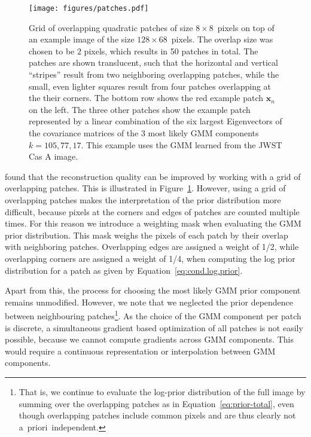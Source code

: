 \documentclass[twocolumn, linenumbers]{aastex631}
\newcommand{\aprioir}{a~priori~}
\begin{document}
 \begin{figure}
        \begin{centering}
            \texttt{[image: figures/patches.pdf]}
            \caption{
                Grid of overlapping quadratic patches of size $8\times8$~pixels on top of an example image of the size $128 \times 68$~pixels. The overlap size was chosen to be $2$ pixels, which results in 50 patches in total. The patches are shown translucent, such that the horizontal and vertical \enquote{stripes} result from two neighboring overlapping patches, while the small, even lighter squares result from four patches overlapping at the their corners. The bottom row shows the red example patch $\mathbf{x}_n$ on the left. The three other patches show the example patch represented by a linear combination of the six largest Eigenvectors of the covariance matrices of the 3 most likely GMM components $k = 105, 77, 17$. This example uses the GMM learned from the JWST Cas A image.
            }
            \label{fig:patches}
        \end{centering}
    \end{figure}


    \cite{Zoran2011} found that the reconstruction quality can be improved by working with a grid of overlapping patches. This is illustrated in Figure~\ref{fig:patches}. However, using a grid of overlapping patches makes the interpretation of the prior distribution more difficult, because pixels at the corners and edges of patches are counted multiple times. For this reason we introduce a weighting mask when evaluating the GMM prior distribution. This mask weighs the pixels of each patch by their overlap with neighboring patches. Overlapping edges are assigned a weight of 1/2, while overlapping corners are assigned a weight of 1/4, when computing the log prior distribution for a patch as given by Equation~\ref{eq:cond.log.prior}.
    
    Apart from this, the process for choosing the most likely GMM prior component remains unmodified. However, we note that we neglected the prior dependence between neighbouring patches\footnote{That is, we continue to evaluate the log-prior distribution of the full image by summing over the overlapping patches as in Equation~\ref{eq:prior-total}, even though overlapping patches include common pixels and are thus clearly not \aprioir independent.}. As the choice of the GMM component per patch is discrete, a simultaneous gradient based optimization of all patches is not easily possible, because we cannot compute gradients across GMM components. This would require a continuous representation or interpolation between GMM components.
   
\end{document}
